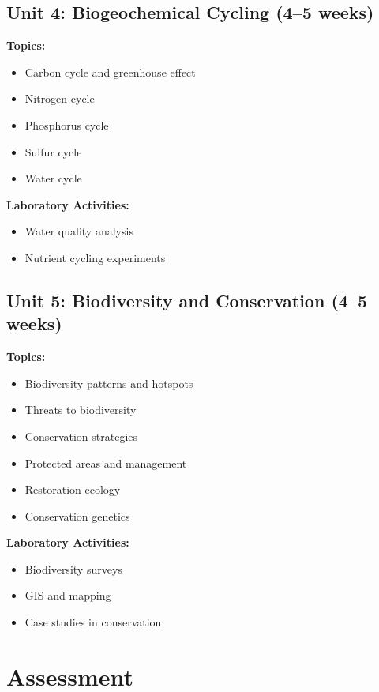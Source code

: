 \documentclass[12pt,oneside]{book}
\begin{document}
\subsection{Unit 4: Biogeochemical Cycling (4--5 weeks)}

\textbf{Topics:}
\begin{itemize}
    \item Carbon cycle and greenhouse effect
    \item Nitrogen cycle
    \item Phosphorus cycle
    \item Sulfur cycle
    \item Water cycle
\end{itemize}

\textbf{Laboratory Activities:}
\begin{itemize}
    \item Water quality analysis
    \item Nutrient cycling experiments
\end{itemize}

\subsection{Unit 5: Biodiversity and Conservation (4--5 weeks)}

\textbf{Topics:}
\begin{itemize}
    \item Biodiversity patterns and hotspots
    \item Threats to biodiversity
    \item Conservation strategies
    \item Protected areas and management
    \item Restoration ecology
    \item Conservation genetics
\end{itemize}

\textbf{Laboratory Activities:}
\begin{itemize}
    \item Biodiversity surveys
    \item GIS and mapping
    \item Case studies in conservation
\end{itemize}

\section{Assessment}
\end{document}
